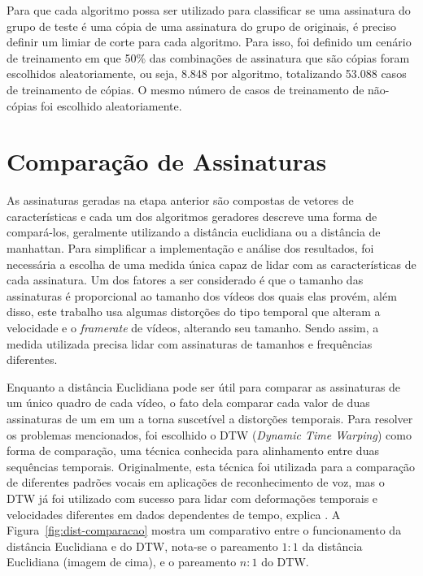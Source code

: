 Para que cada algoritmo possa ser utilizado para classificar se uma assinatura do grupo de teste é uma cópia de uma assinatura do grupo de originais, é preciso definir um limiar de corte para cada algoritmo. Para isso, foi definido um cenário de treinamento em que 50\% das combinações de assinatura que são cópias foram escolhidos aleatoriamente, ou seja, 8.848 por algoritmo, totalizando 53.088 casos de treinamento de cópias. O mesmo número de casos de treinamento de não-cópias foi escolhido aleatoriamente.

\section{Comparação de Assinaturas}
\label{sec:met-comparacao}

As assinaturas geradas na etapa anterior são compostas de vetores de características e cada um dos algoritmos geradores descreve uma forma de compará-los, geralmente utilizando a distância euclidiana ou a distância de manhattan. Para simplificar a implementação e análise dos resultados, foi necessária a escolha de uma medida única capaz de lidar com as características de cada assinatura. Um dos fatores a ser considerado é que o tamanho das assinaturas é proporcional ao tamanho dos vídeos dos quais elas provém, além disso, este trabalho usa algumas distorções do tipo temporal que alteram a velocidade e o \textit{framerate} de vídeos, alterando seu tamanho. Sendo assim, a medida utilizada precisa lidar com assinaturas de tamanhos e frequências diferentes.

Enquanto a distância Euclidiana pode ser útil para comparar as assinaturas de um único quadro de cada vídeo, o fato dela comparar cada valor de duas assinaturas de um em um a torna suscetível a distorções temporais. Para resolver os problemas mencionados, foi escolhido o DTW (\textit{Dynamic Time Warping}) como forma de comparação, uma técnica conhecida para alinhamento entre duas sequências temporais. Originalmente, esta técnica foi utilizada para a comparação de diferentes padrões vocais em aplicações de reconhecimento de voz, mas o DTW já foi utilizado com sucesso para lidar com deformações temporais e velocidades diferentes em dados dependentes de tempo, explica \citeauthor{muller2007dynamic}. A Figura~\ref{fig:dist-comparacao} mostra um comparativo entre o funcionamento da distância Euclidiana e do DTW, nota-se o pareamento $1:1$ da distância Euclidiana (imagem de cima), e o pareamento $n:1$ do DTW.

